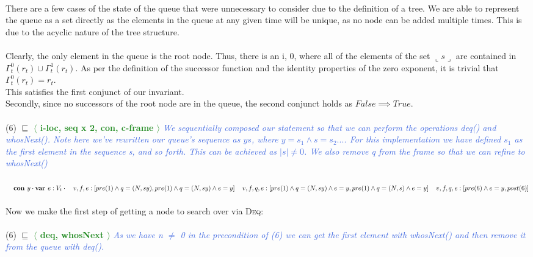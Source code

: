 \documentclass[a4paper]{scrartcl}
\newcommand{\refinedby}{\sqsubseteq} %
\newcommand{\rc}[1]{ $\refinedby$ \quad \textbf{\textcolor{ForestGreen}{$\langle$ #1 $\rangle$}}}
\newcommand{\explain}[1]{\textcolor{RoyalBlue}{\textit{#1}}}
\begin{document}
{\begin{equation*}
\end{equation*} \\ 
There are a few cases of the state of the queue that were unnecessary to consider due to the definition of a tree.
We are able to represent the queue as a set directly as the elements in the queue at any given time will be unique, as no node can be added multiple times. This is due to the acyclic nature of the tree structure. \\ \\
%
Clearly, the only element in the queue is the root node. Thus, there is an i, $0$, where all of the elements of the set $\llcorner s \lrcorner$ are contained in $\Gamma^0_t(r_t) \cup \Gamma^1_t(r_t)$. As per the definition of the successor function and the identity properties of the zero exponent, it is trivial that $\Gamma^0_t(r_t) = r_t$.\\ 
This satisfies the first conjunct of our invariant. \\
Secondly, since no successors of the root node are in the queue, the second conjunct holds as $False \implies True$.\\ \\
(6) \rc{i-loc, seq x 2, con, c-frame} \explain{We sequentially composed our statement so that we can perform the operations deq() and whosNext(). Note here we've rewritten our queue's sequence as $ys$, where $y = s_1 \land s = s_{2}...$. For this implementation we have defined $s_1$ as the first element in the sequence s, and so forth. This can be achieved as $|s| \neq 0$. We also remove q from the frame so that we can refine to whosNext()} \\ \\
$
\null \quad \textbf{con } y \cdot \textbf{var } e : V_t \cdot \\
\null \quad v, f, e : \left[ pre(1) \land q = (N, sy), pre(1) \land q = (N, sy) \land e = y \right] \\
\null \quad v, f, q, e : \left[ pre(1) \land q = (N, sy) \land e = y, pre(1) \land q = (N, s) \land e = y  \right] \\
\null \quad v, f, q, e : \left[ pre(6) \land e = y, post(6) \right]
$ \\ \\
Now we make the first step of getting a node to search over via \textsc{Deq}: \\ \\
(6) \rc{deq, whosNext} \explain{As we have n $\neq$ 0 in the precondition of (6) we can get the first element with whosNext() and then remove it from the queue with deq().} \\ \\
}
\end{document}
